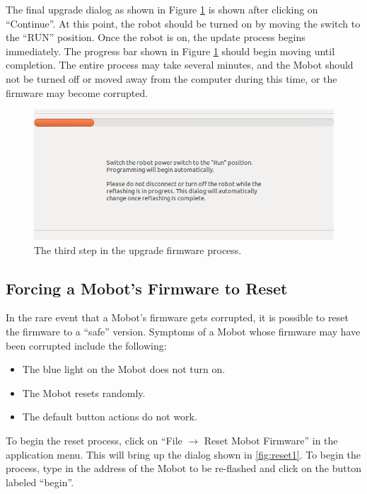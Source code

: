 \documentclass{article}
\begin{document}
The final upgrade dialog as shown in Figure \ref{fig:update4}  is shown after
clicking on ``Continue''. At this point, the
robot should be turned on by moving the switch to the ``RUN'' position. Once the
robot is on, the update process begins immediately. The progress bar shown in 
Figure \ref{fig:update4} should begin moving until completion. The entire process 
may take several minutes, and the Mobot should not be turned off or moved away from
the computer during this time, or the firmware may become corrupted.

\begin{figure}[H]
\begin{center}
\includegraphics[width=4.5in]{images/reset4.png}
\end{center}
\caption{\label{fig:update4} The third step in the upgrade firmware process.}
\end{figure}

\subsection{Forcing a Mobot's Firmware to Reset}
In the rare event that a Mobot's firmware gets corrupted, it is possible to 
reset the firmware to a ``safe'' version. Symptoms of a Mobot whose firmware
may have been corrupted include the following:
\begin{itemize}
\item The blue light on the Mobot does not turn on.
\item The Mobot resets randomly.
\item The default button actions do not work.
\end{itemize}
To begin the reset process, click on
``File $\rightarrow$ Reset Mobot Firmware'' in the application menu. This will bring up the dialog shown
in \ref{fig:reset1}. To begin the process, type in the address of the Mobot to be re-flashed
and click on the button labeled ``begin''. 
\end{document}
